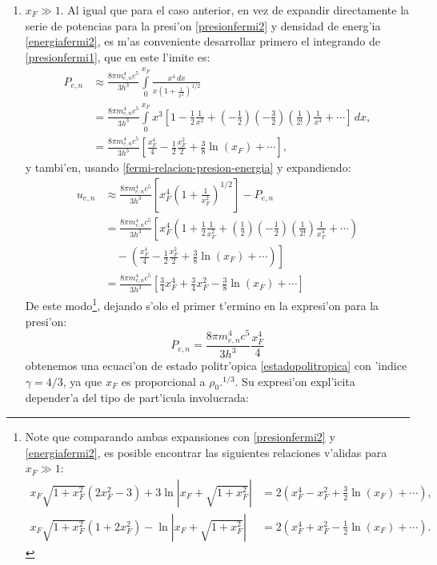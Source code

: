 \begin{enumerate}
\begin{enumerate}
\end{enumerate}
 \item $x_F\gg1$. Al igual que para el caso anterior, en vez de expandir directamente la serie de potencias para la presi'on \eqref{presionfermi2} y densidad de energ'ia \eqref{energiafermi2}, es m'as conveniente desarrollar primero el integrando de \eqref{presionfermi1}, que en este l'imite es:
\begin{align}
P_{e,n}&\approx\frac{8\pi m_{e,n}^4c^5}{3h^3}\int\limits_0^{x_F}\frac{x^4\,dx}{x\left(1+\frac{1}{x^2}\right)^{1/2}}\\
&=\frac{8\pi m_{e,n}^4c^5}{3h^3}\int\limits_0^{x_F}x^3
\left[1-\frac{1}{2}\frac{1}{x^2}+\left(-\frac{1}{2}\right)\left(-\frac{3}{2}\right)\left(\frac{1}{2!}\right)\frac{1}{x^4}+\cdots\right]\,dx,\\
&=\frac{8\pi m_{e,n}^4c^5}{3h^3}\left[\frac{x_F^4}{4}-\frac{1}{2}\frac{x_F^2}{2}+\frac{3}{8}\ln(x_F)+\cdots\right],
\end{align}
y tambi'en, usando \eqref{fermi-relacion-presion-energia} y expandiendo:
\begin{align}
 u_{e,n}&\approx\frac{8\pi m_{e,n}^4c^5}{3h^3}\left[x_F^4\left(1+\frac{1}{x_F^2}\right)^{1/2}\right]-P_{e,n}\\
&=\frac{8\pi m_{e,n}^4c^5}{3h^3}\left[x_F^4\left(1+\frac{1}{2}\frac{1}{x_F^2}+\left(\frac{1}{2}\right)\left(-\frac{1}{2}\right)\left(\frac{1}{2!}\right)\frac{1}{x_F^4}+\cdots\right)\right.\\
&\left.\quad-\left(\frac{x_F^4}{4}-\frac{1}{2}\frac{x_F^2}{2}+\frac{3}{8}\ln(x_F)+\cdots\right)\right]\\
&=\frac{8\pi m_{e,n}^4c^5}{3h^3}\left[\frac{3}{4}x_F^4+\frac{3}{4}x_F^2-\frac{3}{8}\ln(x_F)+\cdots\right]\label{energia_expansion_fermi_relativista}
\end{align}
De este modo\footnote{Note que comparando ambas expansiones con \eqref{presionfermi2} y \eqref{energiafermi2}, es posible encontrar las siguientes relaciones v'alidas para $x_F\gg1$:
\begin{align}
 x_F\sqrt{1+x_F^2}\left(2x_F^2-3\right)+3\ln\left|x_F+\sqrt{1+x_F^2}\right|&=2\left(x_F^4-x_F^2+\frac{3}{2}\ln(x_F)+\cdots\right),\\
 x_F\sqrt{1+x_F^2}\left(1+2x_F^2\right)-\ln\left|x_F+\sqrt{1+x_F^2}\right|&=2\left(x_F^4+x_F^2-\frac{1}{2}\ln(x_F)+\cdots \right).
\end{align}
}, dejando s'olo el primer t'ermino en la expresi'on para la presi'on:
\begin{equation}\label{presionfermi2-asintotico}
P_{e,n}=\frac{8\pi m_{e,n}^4c^5}{3h^3}\frac{x_F^4}{4}
\end{equation}
obtenemos una ecuaci'on de estado politr'opica \eqref{estadopolitropica} con 'indice $\gamma=4/3$, ya que $x_F$ es proporcional a $\rho_0.^{1/3}$. Su expresi'on expl'icita depender'a del tipo de part'icula involucrada:


\end{enumerate}
